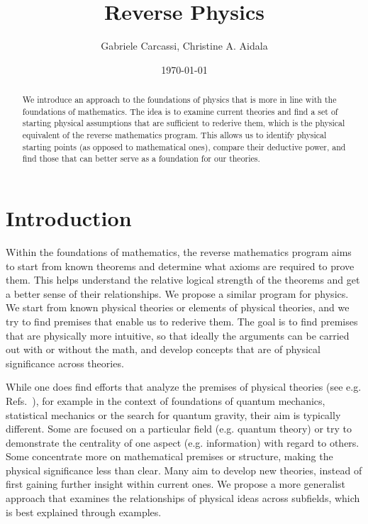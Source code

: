 \documentclass[10pt,twocolumn, nofootinbib]{revtex4-2}
\begin{document}
\title{Reverse Physics}
\author{Gabriele Carcassi, Christine A. Aidala}

\date{\today}


\begin{abstract}
We introduce an approach to the foundations of physics that is more in line with the foundations of mathematics. The idea is to examine current theories and find a set of starting physical assumptions that are sufficient to rederive them, which is the physical equivalent of the reverse mathematics program. This allows us to identify physical starting points (as opposed to mathematical ones), compare their deductive power, and find those that can better serve as a foundation for our theories.
\end{abstract}

\maketitle

\section{Introduction}

Within the foundations of mathematics, the reverse mathematics program\cite{friedman1976systems,simpson2017reverse,stillwellreverse} aims to start from known theorems and determine what axioms are required to prove them. This helps understand the relative logical strength of the theorems and get a better sense of their relationships. We propose a similar program for physics. We start from known physical theories or elements of physical theories, and we try to find premises that enable us to rederive them. The goal is to find premises that are physically more intuitive, so that ideally the arguments can be carried out with or without the math, and develop concepts that are of physical significance across theories.

While one does find efforts that analyze the premises of physical theories (see e.g. Refs.~\cite{chiribella2011informational, selby2021reconstructing, giles2016mathematical, boyling1972axiomatic, PhysRev.101.860, Haag1964848, axiomaticQFT1975, masanes2019measurement, carcassi2021four}), for example in the context of foundations of quantum mechanics, statistical mechanics or the search for quantum gravity, their aim is typically different. Some are focused on a particular field (e.g. quantum theory) or try to demonstrate the centrality of one aspect (e.g. information) with regard to others. Some concentrate more on mathematical premises or structure, making the physical significance less than clear. Many aim to develop new theories, instead of first gaining further insight within current ones. We propose a more generalist approach that examines the relationships of physical ideas across subfields, which is best explained through examples. 
\end{document}
